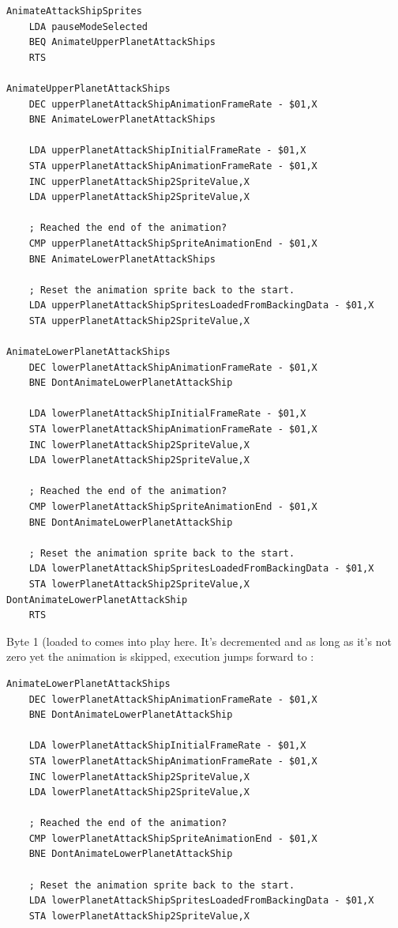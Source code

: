 \begin{lstlisting}[caption=Routine for Animating Enemy Sprites. ]
AnimateAttackShipSprites
    LDA pauseModeSelected
    BEQ AnimateUpperPlanetAttackShips
    RTS

AnimateUpperPlanetAttackShips   
    DEC upperPlanetAttackShipAnimationFrameRate - $01,X
    BNE AnimateLowerPlanetAttackShips

    LDA upperPlanetAttackShipInitialFrameRate - $01,X
    STA upperPlanetAttackShipAnimationFrameRate - $01,X
    INC upperPlanetAttackShip2SpriteValue,X
    LDA upperPlanetAttackShip2SpriteValue,X

    ; Reached the end of the animation?
    CMP upperPlanetAttackShipSpriteAnimationEnd - $01,X
    BNE AnimateLowerPlanetAttackShips

    ; Reset the animation sprite back to the start.
    LDA upperPlanetAttackShipSpritesLoadedFromBackingData - $01,X
    STA upperPlanetAttackShip2SpriteValue,X

AnimateLowerPlanetAttackShips   
    DEC lowerPlanetAttackShipAnimationFrameRate - $01,X
    BNE DontAnimateLowerPlanetAttackShip

    LDA lowerPlanetAttackShipInitialFrameRate - $01,X
    STA lowerPlanetAttackShipAnimationFrameRate - $01,X
    INC lowerPlanetAttackShip2SpriteValue,X
    LDA lowerPlanetAttackShip2SpriteValue,X

    ; Reached the end of the animation?
    CMP lowerPlanetAttackShipSpriteAnimationEnd - $01,X
    BNE DontAnimateLowerPlanetAttackShip

    ; Reset the animation sprite back to the start.
    LDA lowerPlanetAttackShipSpritesLoadedFromBackingData - $01,X
    STA lowerPlanetAttackShip2SpriteValue,X
DontAnimateLowerPlanetAttackShip   
    RTS
\end{lstlisting}
 
Byte 1 (loaded to  comes into play here. It's decremented and as long as it's
not zero yet the animation is skipped, execution jumps forward to :

\begin{lstlisting}
AnimateLowerPlanetAttackShips   
    DEC lowerPlanetAttackShipAnimationFrameRate - $01,X
    BNE DontAnimateLowerPlanetAttackShip

    LDA lowerPlanetAttackShipInitialFrameRate - $01,X
    STA lowerPlanetAttackShipAnimationFrameRate - $01,X
    INC lowerPlanetAttackShip2SpriteValue,X
    LDA lowerPlanetAttackShip2SpriteValue,X

    ; Reached the end of the animation?
    CMP lowerPlanetAttackShipSpriteAnimationEnd - $01,X
    BNE DontAnimateLowerPlanetAttackShip

    ; Reset the animation sprite back to the start.
    LDA lowerPlanetAttackShipSpritesLoadedFromBackingData - $01,X
    STA lowerPlanetAttackShip2SpriteValue,X
\end{lstlisting}

